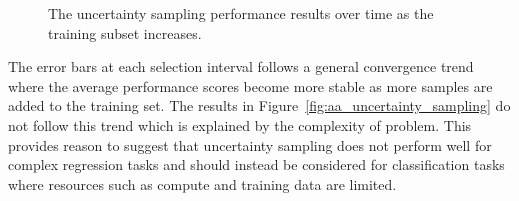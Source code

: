 \documentclass[conference]{IEEEtran}
\begin{document}
\begin{figure}[htbp]
		\hfil
		\caption{The uncertainty sampling performance results over time as the training subset increases.}
		\label{fig:uncertainty_sampling_all}
	\end{figure}
	
	The error bars at each selection interval follows a general convergence trend where the average performance scores become more stable as more samples are added to the training set. The results in Figure~\ref{fig:aa_uncertainty_sampling} do not follow this trend which is explained by the complexity of problem. This provides reason to suggest that uncertainty sampling does not perform well for complex regression tasks and should instead be considered for classification tasks where resources such as compute and training data are limited.
	
\end{document}
